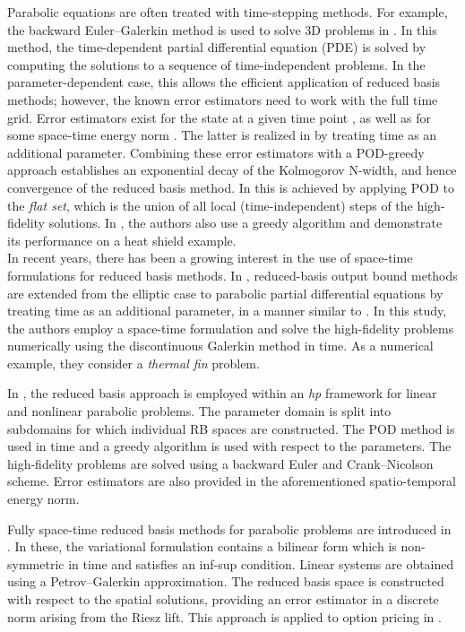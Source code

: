 \documentclass{article}
\theoremstyle{plain}
\theoremstyle{definition}
\theoremstyle{remark}
\begin{document}
Parabolic equations are often treated with time-stepping methods. For example, the backward Euler--Galerkin method is used to solve 3D problems in \cite{Gelsomino01082011}. In this method, the time-dependent partial differential equation (PDE) is solved by computing the solutions to a sequence of time-independent problems. In the parameter-dependent case, this allows the efficient application of reduced basis methods; however, the known error estimators need to work with the full time grid. Error estimators exist for the state at a given time point \cites[Prop.~2.80]{haasdonk2017reduced}[§~6.1.3]{Hesthaven2016}, as well as for some space-time energy norm \cites[Prop.~4.1]{greplpatera}[Prop.~2.82]{haasdonk2017reduced}. The latter is realized in \cite{greplpatera} by treating time as an additional parameter. Combining these error estimators with a POD-greedy approach establishes an exponential decay of the Kolmogorov N-width, and hence convergence of the reduced basis method. In \cite[Prop.~4.4]{haasdonkCONVrb} this is achieved by applying POD to the \textit{flat set}, which is the union of all local (time-independent) steps of the high-fidelity solutions. In \cite{greplpatera}, the authors also use a greedy algorithm and demonstrate its performance on a heat shield example. \\

In recent years, there has been a growing interest in the use of space-time formulations for reduced basis methods. In \cite{rovas2006reduced}, reduced-basis output bound methods are extended from the elliptic case to parabolic partial differential equations by treating time as an additional parameter, in a manner similar to \cite{greplpatera}. In this study, the authors employ a space-time formulation and solve the high-fidelity problems numerically using the discontinuous Galerkin method in time. As a numerical example, they consider a \textit{thermal fin} problem.

In \cite{eftang2011hp}, the reduced basis approach is employed within an \textit{hp}  framework for linear and nonlinear parabolic problems. The parameter domain is split into subdomains for which individual RB spaces are constructed. The POD method is used in time and a greedy algorithm is used with respect to the parameters. The high-fidelity problems are solved using a backward Euler and Crank--Nicolson scheme. Error estimators are also provided in the aforementioned spatio-temporal energy norm.

Fully space-time reduced basis methods for parabolic problems are introduced in \cites{urban2012new}{urban2014improved}. In these, the variational formulation contains a bilinear form which is non-symmetric in time and satisfies an inf-sup condition. Linear systems are obtained using a Petrov--Galerkin approximation. The reduced basis space is constructed with respect to the spatial solutions, providing an error estimator in a discrete norm arising from the Riesz lift. This approach is applied to option pricing in \cite{Mayerhofer2016}.
\end{document}
